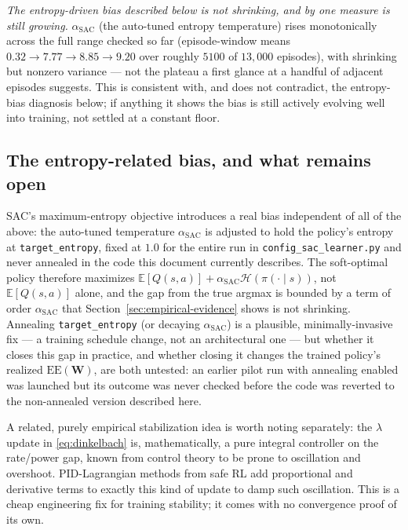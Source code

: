 \documentclass[11pt]{article}
\begin{document}
\emph{The entropy-driven bias described below is not shrinking, and by one
measure is still growing.} $\alpha_\text{SAC}$ (the auto-tuned entropy
temperature) rises monotonically across the full range checked so far
(episode-window means $0.32\to 7.77\to 8.85\to 9.20$ over roughly $5100$ of
$13{,}000$ episodes), with shrinking but nonzero variance --- not the plateau
a first glance at a handful of adjacent episodes suggests. This is
consistent with, and does not contradict, the entropy-bias diagnosis below;
if anything it shows the bias is still actively evolving well into training,
not settled at a constant floor.

\subsection{The entropy-related bias, and what remains open}
\label{sec:open}

SAC's maximum-entropy objective introduces a real bias independent of all of
the above: the auto-tuned temperature $\alpha_{\text{SAC}}$ is adjusted to
hold the policy's entropy at \texttt{target\_entropy}, fixed at $1.0$ for
the entire run in \texttt{config\_sac\_learner.py} and never annealed in the
code this document currently describes. The soft-optimal policy therefore
maximizes $\mathbb{E}[Q(s,a)]+\alpha_{\text{SAC}}\mathcal{H}(\pi(\cdot\mid s))$,
not $\mathbb{E}[Q(s,a)]$ alone, and the gap from the true argmax is bounded
by a term of order $\alpha_{\text{SAC}}$ that Section~\ref{sec:empirical-evidence}
shows is not shrinking. Annealing \texttt{target\_entropy} (or decaying
$\alpha_\text{SAC}$) is a plausible, minimally-invasive fix --- a training
schedule change, not an architectural one --- but whether it closes this gap
in practice, and whether closing it changes the trained policy's realized
$\mathrm{EE}(\mathbf{W})$, are both untested: an earlier pilot run with
annealing enabled was launched but its outcome was never checked before the
code was reverted to the non-annealed version described here.

A related, purely empirical stabilization idea is worth noting separately:
the $\lambda$ update in \eqref{eq:dinkelbach} is, mathematically, a pure
integral controller on the rate/power gap, known from control theory to be
prone to oscillation and overshoot. PID-Lagrangian methods from safe RL
\cite{StookeAchiamAbbeel2020} add proportional and derivative terms to
exactly this kind of update to damp such oscillation. This is a cheap
engineering fix for training stability; it comes with no convergence proof
of its own.
\end{document}
